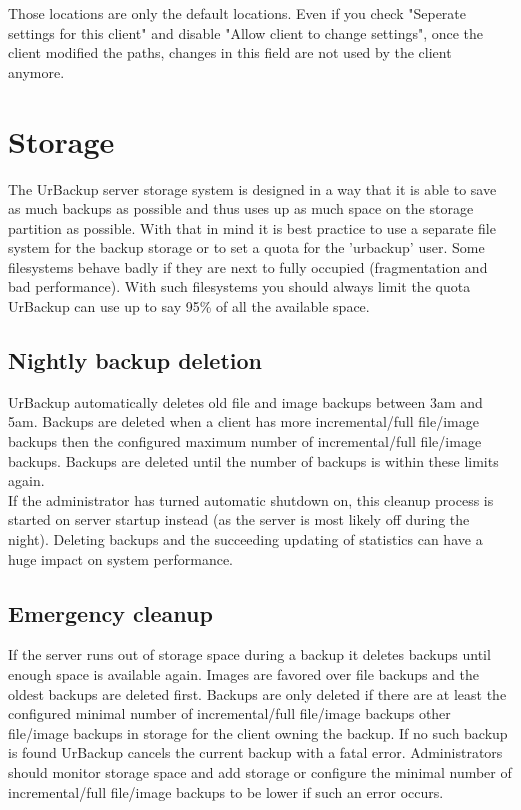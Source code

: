 \documentclass[a4paper,10pt]{article}
\begin{document}
Those locations are only the default locations. Even if you check "Seperate settings for this client" and disable "Allow client to change settings", once the client modified the paths, changes in this field are not used by the client anymore.


\section{Storage}

The UrBackup server storage system is designed in a way that it is able to save as much backups as possible and thus uses up as much space on the storage partition as possible. With that in mind it is best practice to use a separate file system for the backup storage or to set a quota for the 'urbackup' user. Some filesystems behave badly if they are next to fully occupied (fragmentation and bad performance). With such filesystems you should always limit the quota UrBackup can use up to say 95\% of all the available space.

\subsection{Nightly backup deletion}

UrBackup automatically deletes old file and image backups between 3am and 5am. Backups are deleted when a client has more incremental/full file/image backups then the configured maximum number of incremental/full file/image backups. Backups are deleted until the number of backups is within these limits again.\\
If the administrator has turned automatic shutdown on, this cleanup process is started on server startup instead (as the server is most likely off during the night). Deleting backups and the succeeding updating of statistics can have a huge impact on system performance.

\subsection{Emergency cleanup}

If the server runs out of storage space during a backup it deletes backups until enough space is available again. Images are favored over file backups and the oldest backups are deleted first. Backups are only deleted if there are at least the configured minimal number of incremental/full file/image backups other file/image backups in storage for the client owning the backup. If no such backup is found UrBackup cancels the current backup with a fatal error. Administrators should monitor storage space and add storage or configure the minimal number of incremental/full file/image backups to be lower if such an error occurs. 
\end{document}
